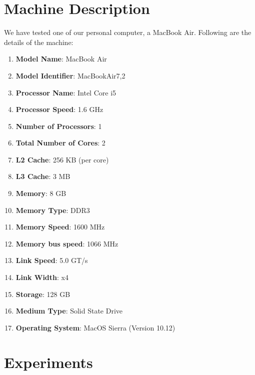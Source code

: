 \documentclass[conference]{IEEEtran}
\begin{document}

\section{Machine Description}
We have tested one of our personal computer, a MacBook Air. Following are the details of the machine:
\begin{enumerate}

\item
\textbf{Model Name}: MacBook Air
\item
\textbf{Model Identifier}: MacBookAir7,2
\item
\textbf{Processor Name}: Intel Core i5
\item
\textbf{Processor Speed}:  1.6 GHz
\item
\textbf{Number of Processors}: 1
\item
\textbf{Total Number of Cores}:  2
\item
\textbf{L2 Cache}: 256 KB (per core)
\item
\textbf{L3 Cache}: 3 MB
\item
\textbf{Memory}: 8 GB
\item
\textbf{Memory Type}: DDR3
\item
\textbf{Memory Speed}:  1600 MHz
\item
\textbf{Memory bus speed}: 1066 MHz 
\item
\textbf{Link Speed}: 5.0 GT/s
\item
\textbf{Link Width}: x4
\item
\textbf{Storage}: 128 GB 
\item
\textbf{Medium Type}:  Solid State Drive
\item
\textbf{Operating System}: MacOS Sierra (Version 10.12)

\end{enumerate}  


\section{Experiments}
\end{document}
